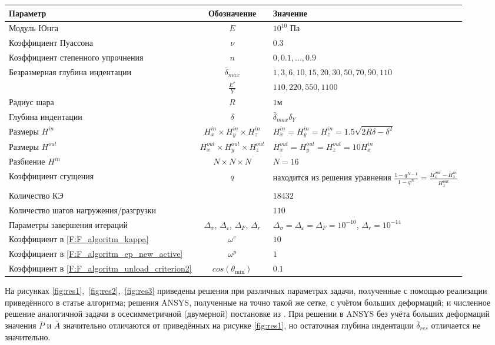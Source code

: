 \documentclass[]{article}
\begin{document}
\begin{table}[h!]
\begin{tabular}{|p{5.3cm}|c|p{7cm}|}
		\hline
		Параметр & Обозначение & Значение \\
		\hline
		Модуль Юнга & $E$ & $10^{10}$ Па \\
		\hline
		Коэффициент Пуассона & $\nu$ & $0.3$ \\
		\hline
		Коэффициент степенного упрочнения& $n$ & $0, 0.1, ..., 0.9$ \\
		\hline
		Безразмерная глубина индентации&
		$\bar{\delta}_{max}$
		& $1,3,6,10,15,20,30,50,70,90,110$   \\
		\hline
		& $\frac{E^*}{Y}$ & $110, 220, 550, 1100$    \\
		\hline
		Радиус шара & $R$ & $1$м \\
		\hline
		Глубина индентации & $\delta$ & $\bar{\delta}_{max}\delta_Y$ \\
		\hline
		Размеры $H^{in}$ & $H_x^{in}\times H_y^{in}\times H_z^{in}$ & $H_x^{in}=H_y^{in}=H_z^{in}=1.5\sqrt{2R\delta-\delta^2}$\\
		\hline
		Размеры $H^{out}$ & $H_x^{out}\times H_y^{out}\times H_z^{out}$ & $H_x^{out}=H_y^{out}=H_z^{out}=10 H_x^{in}$\\
		\hline
		Разбиение $H^{in}$ & $N\times N\times N$ & $N=16$ \\
		\hline
		Коэффициент сгущения& $q$ & находится из решения уравнения  $\frac{1-q^{N-1}}{1-q^{N}}=\frac{H_x^{out}-H_x^{in}}{H_x^{out}}$ \\
		\hline
		Количество КЭ &  & $18432$ \\
		\hline
		Количество шагов нагружения/разгрузки &  & $110$ \\
		\hline
		Параметры завершения итераций & $\Delta_{\sigma}$, $\Delta_{\varepsilon}$, $\Delta_{F}$, $\Delta_{r}$ & $\Delta_{\sigma}=\Delta_{\varepsilon}=\Delta_{F}=10^{-10}$, \newline $\Delta_{r}=10^{-14}$ \\
		\hline
		Коэффициент в \eqref{F:F_algoritm_kappa} & $\omega^{c}$ & $10$ \\
		\hline
		Коэффициент в \eqref{F:F_algoritm_ep_new_active}& $\omega^{p}$ & $1$ \\
		\hline
		Коэффициент в \eqref{F:F_algoritm_unload_criterion2} & $cos\left(\theta_{\mathrm{min}}\right)$ & $0.1$ \\
		\hline
	\end{tabular}
	\label{tab:test1_parameters}
\end{table}

На рисунках \mbox{\ref{fig:res1}, \ref{fig:res2}, \ref{fig:res3}} приведены решения при различных параметрах задачи, полученные с помощью реализации приведённого в статье алгоритма; решения ANSYS, полученные на точно такой же сетке, с учётом больших деформаций; и численное решение аналогичной задачи в осесимметричной (двумерной) постановке из \cite{Song2014}. При решении в ANSYS без учёта больших деформаций значения $\bar{P}$ и $\bar{A}$ значительно отличаются от приведённых на рисунке \ref{fig:res1}, но остаточная глубина индентации $\bar{\delta}_{res}$ отличается не значительно.
\end{document}
